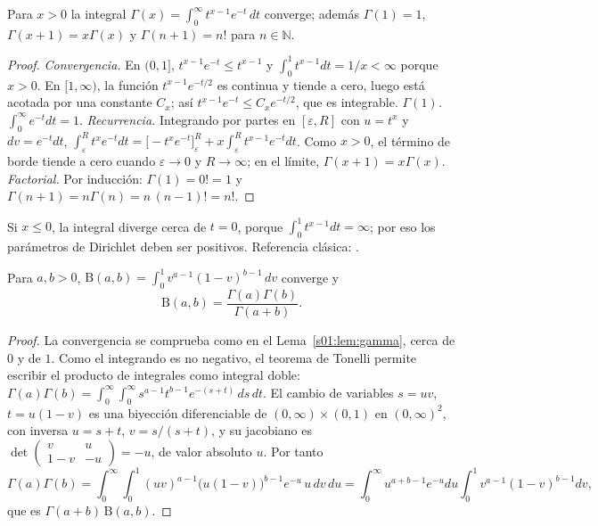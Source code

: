 \begin{lema}\label{s01:lem:gamma}
Para $x>0$ la integral $\Gamma(x)=\int_0^\infty t^{x-1}e^{-t}\,dt$ converge;
además $\Gamma(1)=1$, $\Gamma(x+1)=x\Gamma(x)$ y $\Gamma(n+1)=n!$ para
$n\in\mathbb N$.
\end{lema}
\begin{proof}
\emph{Convergencia.} En $(0,1]$, $t^{x-1}e^{-t}\le t^{x-1}$ y
$\int_0^1t^{x-1}dt=1/x<\infty$ porque $x>0$. En $[1,\infty)$, la función
$t^{x-1}e^{-t/2}$ es continua y tiende a cero, luego está acotada por una
constante $C_x$; así $t^{x-1}e^{-t}\le C_xe^{-t/2}$, que es integrable.
\emph{$\Gamma(1)$.} $\int_0^\infty e^{-t}dt=1$.
\emph{Recurrencia.} Integrando por partes en $[\varepsilon,R]$ con $u=t^x$ y
$dv=e^{-t}dt$,
$\int_\varepsilon^Rt^xe^{-t}dt=\bigl[-t^xe^{-t}\bigr]_\varepsilon^R
+x\int_\varepsilon^Rt^{x-1}e^{-t}dt$. Como $x>0$, el término de borde tiende a
cero cuando $\varepsilon\to0$ y $R\to\infty$; en el límite,
$\Gamma(x+1)=x\Gamma(x)$.
\emph{Factorial.} Por inducción: $\Gamma(1)=0!=1$ y
$\Gamma(n+1)=n\Gamma(n)=n\,(n-1)!=n!$.
\end{proof}
\noindent Si $x\le0$, la integral diverge cerca de $t=0$, porque
$\int_0^1t^{x-1}dt=\infty$; por eso los parámetros de Dirichlet deben ser
positivos. Referencia clásica: \citet{artin1964gamma}.

\begin{lema}\label{s01:lem:beta}
Para $a,b>0$, $\mathrm B(a,b)=\int_0^1v^{a-1}(1-v)^{b-1}\,dv$ converge y
\[
\mathrm B(a,b)=\frac{\Gamma(a)\Gamma(b)}{\Gamma(a+b)}.
\]
\end{lema}
\begin{proof}
La convergencia se comprueba como en el Lema~\ref{s01:lem:gamma}, cerca de $0$ y
de $1$. Como el integrando es no negativo, el teorema de Tonelli permite escribir el
producto de integrales como integral doble:
$\Gamma(a)\Gamma(b)=\int_0^\infty\!\int_0^\infty s^{a-1}t^{b-1}e^{-(s+t)}\,ds\,dt$.
El cambio de variables $s=uv$, $t=u(1-v)$ es una biyección diferenciable de
$(0,\infty)\times(0,1)$ en $(0,\infty)^2$, con inversa $u=s+t$, $v=s/(s+t)$, y
su jacobiano es
$\det\begin{pmatrix}v&u\\1-v&-u\end{pmatrix}=-u$, de valor absoluto $u$. Por tanto
\[
\Gamma(a)\Gamma(b)=\int_0^\infty\!\!\int_0^1(uv)^{a-1}\bigl(u(1-v)\bigr)^{b-1}e^{-u}\,u\,dv\,du
=\int_0^\infty u^{a+b-1}e^{-u}du\int_0^1v^{a-1}(1-v)^{b-1}dv,
\]
que es $\Gamma(a+b)\,\mathrm B(a,b)$.
\end{proof}

